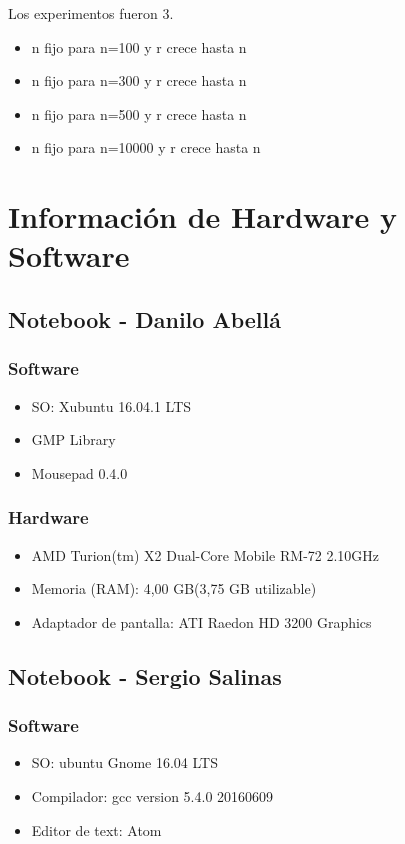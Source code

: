 \documentclass[12pt,letterpaper]{scrartcl}
\begin{document}
Los experimentos fueron 3.

\begin{itemize}
\item n fijo para n=100 y r crece hasta n
\item n fijo para n=300 y r crece hasta n
\item n fijo para n=500 y r crece hasta n
\item n fijo para n=10000 y r crece hasta n
\end{itemize}

\newpage
\section{Información de Hardware y Software}


\subsection{ Notebook - Danilo Abellá}
\subsubsection{Software}
\begin{itemize}
\item SO: Xubuntu 16.04.1 LTS
\item GMP Library
\item Mousepad 0.4.0
\end{itemize}

\subsubsection{Hardware}
\begin{itemize}
\item AMD Turion(tm) X2 Dual-Core Mobile RM-72 2.10GHz
\item Memoria (RAM): 4,00 GB(3,75 GB utilizable)
\item Adaptador de pantalla: ATI Raedon HD 3200 Graphics
\end{itemize}



\subsection{Notebook - Sergio Salinas}
\subsubsection{Software}
\begin{itemize}
\item  SO: ubuntu Gnome 16.04 LTS
\item Compilador: gcc version 5.4.0 20160609 
\item Editor de text: Atom
\end{itemize}
\end{document}

